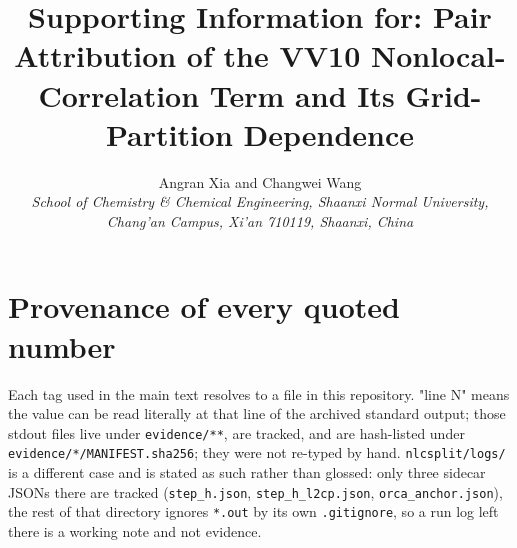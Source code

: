 \documentclass[11pt]{article}
\title{Supporting Information for: Pair Attribution of the VV10 Nonlocal-Correlation Term and Its Grid-Partition Dependence}
\author{Angran Xia and Changwei Wang\\ \small \textit{School of Chemistry \& Chemical Engineering, Shaanxi Normal University,} \\ \small \textit{Chang'an Campus, Xi'an 710119, Shaanxi, China}}
\date{}
\begin{document}
\maketitle
\section*{Provenance of every quoted number}

Each tag used in the main text resolves to a file in this repository. "line N" means the value can be read literally at that line of the archived standard output; those stdout files live under \texttt{evidence/**}, are tracked, and are hash-listed under \texttt{evidence/*/MANIFEST.sha256}; they were not re-typed by hand. \texttt{nlcsplit/logs/} is a different case and is stated as such rather than glossed: only three sidecar JSONs there are tracked (\texttt{step\_h.json}, \texttt{step\_h\_l2cp.json}, \texttt{orca\_anchor.json}), the rest of that directory ignores \texttt{*.out} by its own \texttt{.gitignore}, so a run log left there is a working note and not evidence.
\end{document}
